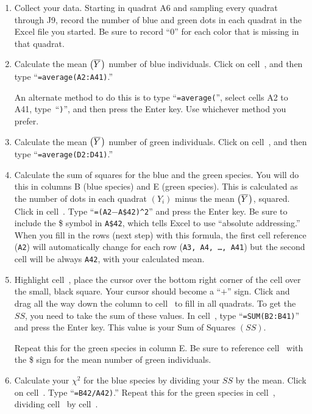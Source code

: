 \documentclass[12pt, hidelinks]{exam}
\newcommand\chisq{$\chi^2$}
\newcommand*\meanY{\overline{Y}\kern0.67pt}
\newcommand*\xcell[1]{cell~\liningnum{#1}}
\begin{document}
\begin{enumerate}

\item Collect your data. Starting in quadrat {\liningnum A6} and sampling every quadrat
through {\liningnum J9}, record the number of blue and green dots in each quadrat
in the Excel file you started. Be sure to record “0” for each
color that is missing in that quadrat.


\item Calculate the mean $\left( \meanY \right)$ number of blue individuals. Click on \xcell{A42}, and then type “\texttt{=average(A2:A41)}.”

 An alternate method to do this is to type “\texttt{=average(}”, select cells {\liningnum A2 to A41}, type~“\texttt{)}”, and then press the Enter key. Use whichever method you prefer.

\item Calculate the mean  $\left( \meanY \right)$ number of green individuals. Click on \xcell{D42}, and then type
“\texttt{=average(D2:D41)}.”

\item Calculate the sum of squares for the blue and the green species. You will do this in
columns B (blue species) and E (green species). This is calculated as the number of dots in each quadrat $\left( Y_i \right)$ minus the mean $\left( \meanY \right)$,
squared. Click in \xcell{B2}. Type “\texttt{=(A2$-$A\$42)\textasciicircum2}” and press the Enter key. 
Be sure to include the \$ symbol in \texttt{A\$42}, which tells Excel to use “absolute addressing.” When you fill in the rows (next step) with this formula, the first cell reference (\texttt{A2}) will automatically change for each row (\texttt{A3,\,A4,\,\dots,\,A41}) but the second cell will be always \texttt{A42}, with your calculated mean. 

\item Highlight \xcell{B2}, place the cursor over the bottom right corner of
the cell over the small, black square. Your cursor should become a “$+$”
sign. Click and drag all the way down the column to \xcell{B41} to fill
in all quadrats.  To get the $SS$, you need to take the sum of these
values. In \xcell{B42}, type “\texttt{=SUM(B2:B41)}” and press the Enter key. This value is your Sum of Squares $(SS)$.

Repeat this for the green species in column E. Be sure to reference \xcell{D42} with the \$ sign for the mean number of green individuals.

\item Calculate your \chisq{} for the blue species by dividing your $SS$ by the mean. Click on \xcell{C42}. Type “\texttt{=B42/A42)}.” Repeat this for the green species in \xcell{F42}, dividing \xcell{E42} by \xcell{D42}. 


\end{enumerate}
\end{document}
